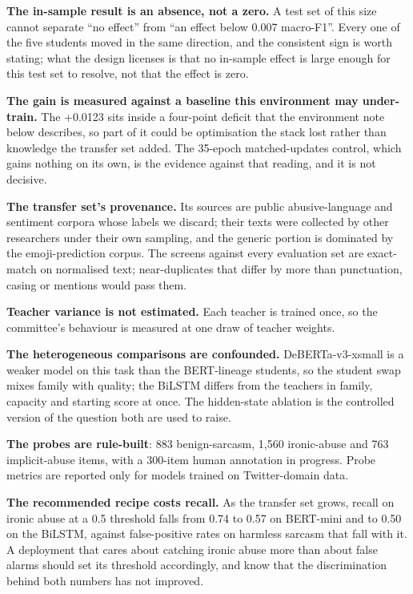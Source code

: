 \textbf{The in-sample result is an absence, not a zero.} A test set of this size cannot separate
``no effect'' from ``an effect below 0.007 macro-F1''. Every one of the five students moved in the
same direction, and the consistent sign is worth stating; what the design licenses is that no
in-sample effect is large enough for this test set to resolve, not that the effect is zero.

\textbf{The gain is measured against a baseline this environment may under-train.} The +0.0123 sits
inside a four-point deficit that the environment note below describes, so part of it could be
optimisation the stack lost rather than knowledge the transfer set added. The 35-epoch
matched-updates control, which gains nothing on its own, is the evidence against that reading, and
it is not decisive.

\textbf{The transfer set's provenance.} Its sources are public abusive-language and sentiment
corpora whose labels we discard; their texts were collected by other researchers under their own
sampling, and the generic portion is dominated by the emoji-prediction corpus. The screens against
every evaluation set are exact-match on normalised text; near-duplicates that differ by more than
punctuation, casing or mentions would pass them.

\textbf{Teacher variance is not estimated.} Each teacher is trained once, so the committee's
behaviour is measured at one draw of teacher weights.

\textbf{The heterogeneous comparisons are confounded.} DeBERTa-v3-xsmall is a weaker model on this
task than the BERT-lineage students, so the student swap mixes family with quality; the BiLSTM
differs from the teachers in family, capacity and starting score at once. The hidden-state ablation
is the controlled version of the question both are used to raise.

\textbf{The probes are rule-built}: 883 benign-sarcasm, 1,560 ironic-abuse and 763 implicit-abuse
items, with a 300-item human annotation in progress. Probe metrics are reported only for models
trained on Twitter-domain data.

\textbf{The recommended recipe costs recall.} As the transfer set grows, recall on ironic abuse at a
0.5 threshold falls from 0.74 to 0.57 on BERT-mini and to 0.50 on the BiLSTM, against false-positive
rates on harmless sarcasm that fall with it. A deployment that cares about catching ironic abuse
more than about false alarms should set its threshold accordingly, and know that the discrimination
behind both numbers has not improved.

